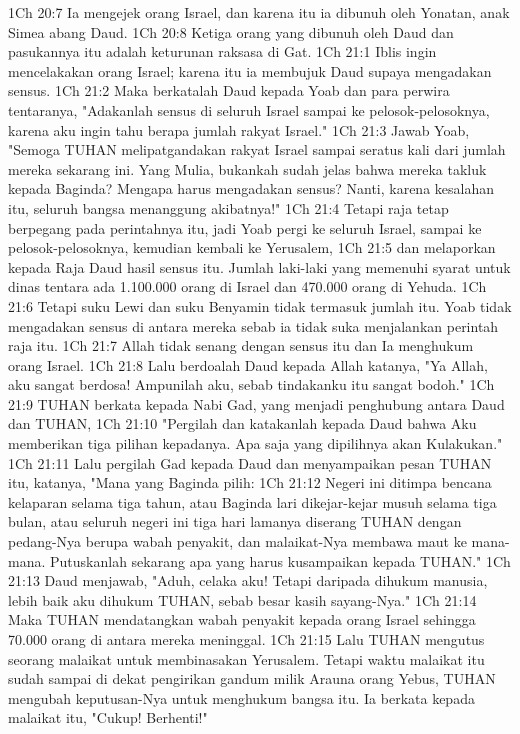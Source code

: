 1Ch 20:7  Ia mengejek orang Israel, dan karena itu ia dibunuh oleh Yonatan, anak Simea abang Daud.
1Ch 20:8  Ketiga orang yang dibunuh oleh Daud dan pasukannya itu adalah keturunan raksasa di Gat.
1Ch 21:1  Iblis ingin mencelakakan orang Israel; karena itu ia membujuk Daud supaya mengadakan sensus.
1Ch 21:2  Maka berkatalah Daud kepada Yoab dan para perwira tentaranya, "Adakanlah sensus di seluruh Israel sampai ke pelosok-pelosoknya, karena aku ingin tahu berapa jumlah rakyat Israel."
1Ch 21:3  Jawab Yoab, "Semoga TUHAN melipatgandakan rakyat Israel sampai seratus kali dari jumlah mereka sekarang ini. Yang Mulia, bukankah sudah jelas bahwa mereka takluk kepada Baginda? Mengapa harus mengadakan sensus? Nanti, karena kesalahan itu, seluruh bangsa menanggung akibatnya!"
1Ch 21:4  Tetapi raja tetap berpegang pada perintahnya itu, jadi Yoab pergi ke seluruh Israel, sampai ke pelosok-pelosoknya, kemudian kembali ke Yerusalem,
1Ch 21:5  dan melaporkan kepada Raja Daud hasil sensus itu. Jumlah laki-laki yang memenuhi syarat untuk dinas tentara ada 1.100.000 orang di Israel dan 470.000 orang di Yehuda.
1Ch 21:6  Tetapi suku Lewi dan suku Benyamin tidak termasuk jumlah itu. Yoab tidak mengadakan sensus di antara mereka sebab ia tidak suka menjalankan perintah raja itu.
1Ch 21:7  Allah tidak senang dengan sensus itu dan Ia menghukum orang Israel.
1Ch 21:8  Lalu berdoalah Daud kepada Allah katanya, "Ya Allah, aku sangat berdosa! Ampunilah aku, sebab tindakanku itu sangat bodoh."
1Ch 21:9  TUHAN berkata kepada Nabi Gad, yang menjadi penghubung antara Daud dan TUHAN,
1Ch 21:10  "Pergilah dan katakanlah kepada Daud bahwa Aku memberikan tiga pilihan kepadanya. Apa saja yang dipilihnya akan Kulakukan."
1Ch 21:11  Lalu pergilah Gad kepada Daud dan menyampaikan pesan TUHAN itu, katanya, "Mana yang Baginda pilih:
1Ch 21:12  Negeri ini ditimpa bencana kelaparan selama tiga tahun, atau Baginda lari dikejar-kejar musuh selama tiga bulan, atau seluruh negeri ini tiga hari lamanya diserang TUHAN dengan pedang-Nya berupa wabah penyakit, dan malaikat-Nya membawa maut ke mana-mana. Putuskanlah sekarang apa yang harus kusampaikan kepada TUHAN."
1Ch 21:13  Daud menjawab, "Aduh, celaka aku! Tetapi daripada dihukum manusia, lebih baik aku dihukum TUHAN, sebab besar kasih sayang-Nya."
1Ch 21:14  Maka TUHAN mendatangkan wabah penyakit kepada orang Israel sehingga 70.000 orang di antara mereka meninggal.
1Ch 21:15  Lalu TUHAN mengutus seorang malaikat untuk membinasakan Yerusalem. Tetapi waktu malaikat itu sudah sampai di dekat pengirikan gandum milik Arauna orang Yebus, TUHAN mengubah keputusan-Nya untuk menghukum bangsa itu. Ia berkata kepada malaikat itu, "Cukup! Berhenti!"
